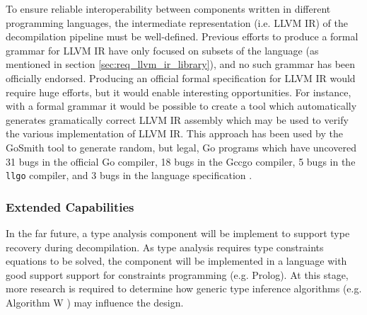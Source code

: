 To ensure reliable interoperability between components written in different programming languages, the intermediate representation (i.e. LLVM IR) of the decompilation pipeline must be well-defined. Previous efforts to produce a formal grammar for LLVM IR have only focused on subsets of the language (as mentioned in section \ref{sec:req_llvm_ir_library}), and no such grammar has been officially endorsed. Producing an official formal specification for LLVM IR would require huge efforts, but it would enable interesting opportunities. For instance, with a formal grammar it would be possible to create a tool which automatically generates gramatically correct LLVM IR assembly which may be used to verify the various implementation of LLVM IR. This approach has been used by the GoSmith tool to generate random, but legal, Go programs which have uncovered 31 bugs in the official Go compiler, 18 bugs in the Gccgo compiler, 5 bugs in the \texttt{llgo} compiler, and 3 bugs in the language specification \cite{gosmith}.


\subsubsection{Extended Capabilities}







In the far future, a type analysis component will be implement to support type recovery during decompilation. As type analysis requires type constraints equations to be solved, the component will be implemented in a language with good support support for constraints programming (e.g. Prolog). At this stage, more research is required to determine how generic type inference algorithms (e.g. Algorithm W \cite{algorithm_w}) may influence the design.
